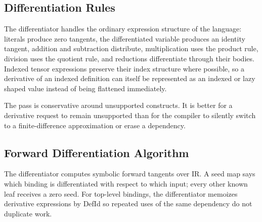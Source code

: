 \subsection{Differentiation Rules}

The differentiator handles the ordinary expression structure of the language:
literals produce zero tangents, the differentiated variable produces an identity
tangent, addition and subtraction distribute, multiplication uses the product
rule, division uses the quotient rule, and reductions differentiate through
their bodies. Indexed tensor expressions preserve their index structure where
possible, so a derivative of an indexed definition can itself be represented as
an indexed or lazy shaped value instead of being flattened immediately.

The pass is conservative around unsupported constructs. It is better for a
derivative request to remain unsupported than for the compiler to silently
switch to a finite-difference approximation or erase a dependency.

\subsection{Forward Differentiation Algorithm}

The differentiator computes symbolic forward tangents over IR. A seed map says
which binding is differentiated with respect to which input; every other known
leaf receives a zero seed. For top-level bindings, the differentiator memoizes
derivative expressions by DefId so repeated uses of the same dependency do not
duplicate work.

